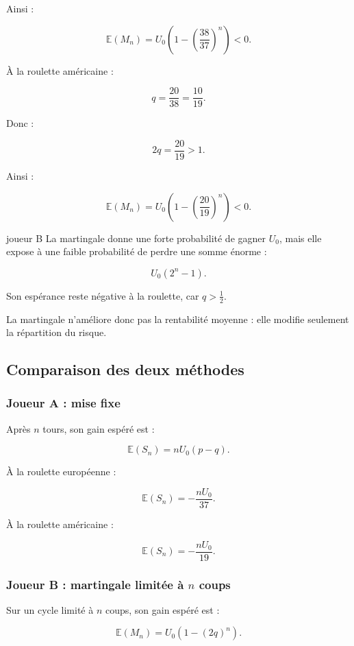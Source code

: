 \documentclass[11pt,a4paper]{article}
\begin{document}
Ainsi :

\[
\mathbb{E}(M_n)
=
U_0\left(1-\left(\frac{38}{37}\right)^n\right)<0.
\]

À la roulette américaine :

\[
q=\frac{20}{38}=\frac{10}{19}.
\]

Donc :

\[
2q=\frac{20}{19}>1.
\]

Ainsi :

\[
\mathbb{E}(M_n)
=
U_0\left(1-\left(\frac{20}{19}\right)^n\right)<0.
\]

\begin{conclusionbox}{joueur B}
La martingale donne une forte probabilité de gagner \(U_0\), mais elle expose à une faible probabilité de perdre une somme énorme :

\[
U_0(2^n-1).
\]

Son espérance reste négative à la roulette, car \(q>\frac12\).

La martingale n'améliore donc pas la rentabilité moyenne : elle modifie seulement la répartition du risque.
\end{conclusionbox}

\subsection{Comparaison des deux méthodes}

\subsubsection*{Joueur A : mise fixe}

Après \(n\) tours, son gain espéré est :

\[
\mathbb{E}(S_n)=nU_0(p-q).
\]

À la roulette européenne :

\[
\mathbb{E}(S_n)=-\frac{nU_0}{37}.
\]

À la roulette américaine :

\[
\mathbb{E}(S_n)=-\frac{nU_0}{19}.
\]

\subsubsection*{Joueur B : martingale limitée à \(n\) coups}

Sur un cycle limité à \(n\) coups, son gain espéré est :

\[
\mathbb{E}(M_n)=U_0\left(1-(2q)^n\right).
\]
\end{document}
